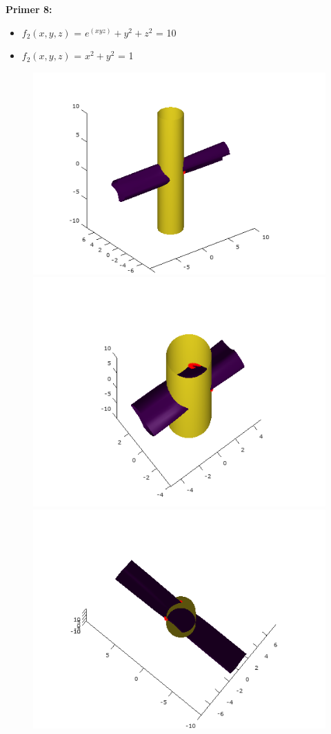 \documentclass[12pt]{article}
\begin{document}
	\begin{minipage}{\textwidth}
	\textbf{\large{Primer 8:}}
	\begin{itemize}  
		\item $f_{2}(x,y,z)$ = $e^{(xyz)}+y^{2}+z^{2}$ = 10
		\item $f_{2}(x,y,z)$ =  $x^2 + y^2$ = 1
	\end{itemize}
	\begin{figure}[H]
    	\centering
    	\includegraphics[scale=0.5]{primer8_1}
    	\includegraphics[scale=0.5]{primer8_2}
    	\includegraphics[scale=0.5]{primer8_3}

\end{figure}
\end{minipage}
\end{document}
